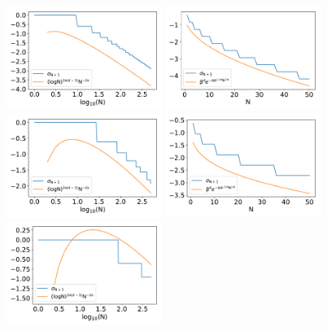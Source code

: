 \documentclass[twoside,11pt]{book}
\numberwithin{theorem}{chapter}
\numberwithin{definition}{chapter}
\numberwithin{proposition}{chapter}
\numberwithin{corollary}{chapter}
\numberwithin{example}{chapter}
\numberwithin{lemma}{chapter}
\numberwithin{assumption}{chapter}
\begin{document}
\begin{figure}[]
    \centering
\includegraphics[width= 0.45\textwidth]{img/neurips/multiSobolev/comparison/Korobov_2D_ko_1_eig_comparison.pdf} 
\includegraphics[width= 0.45\textwidth]{img/neurips/multiHermite/comparison/Gaussian_2D_scale_1_eig_comparison.pdf} \\
\includegraphics[width= 0.45\textwidth]{img/neurips/multiSobolev/comparison/Korobov_3D_ko_1_eig_comparison.pdf} 
\includegraphics[width= 0.45\textwidth]{img/neurips/multiHermite/comparison/Gaussian_3D_scale_1_eig_comparison.pdf}\\
\includegraphics[width= 0.45\textwidth]{img/neurips/multiSobolev/comparison/Korobov_4D_ko_1_eig_comparison.pdf} 

\end{figure}
\end{document}
